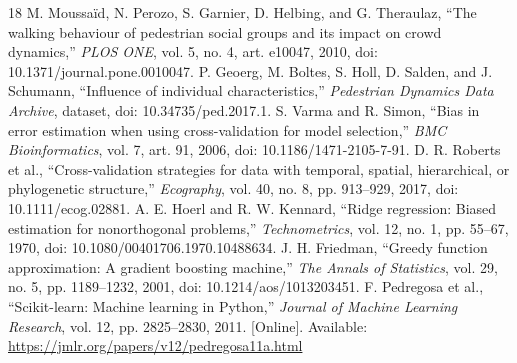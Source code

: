 \documentclass[conference]{IEEEtran}
\begin{document}
\begin{thebibliography}{18}
 M. Moussa\"id, N. Perozo, S. Garnier, D. Helbing, and G. Theraulaz, ``The walking behaviour of pedestrian social groups and its impact on crowd dynamics,'' \textit{PLOS ONE}, vol. 5, no. 4, art. e10047, 2010, doi: 10.1371/journal.pone.0010047.
 P. Geoerg, M. Boltes, S. Holl, D. Salden, and J. Schumann, ``Influence of individual characteristics,'' \textit{Pedestrian Dynamics Data Archive}, dataset, doi: 10.34735/ped.2017.1.
 S. Varma and R. Simon, ``Bias in error estimation when using cross-validation for model selection,'' \textit{BMC Bioinformatics}, vol. 7, art. 91, 2006, doi: 10.1186/1471-2105-7-91.
 D. R. Roberts et al., ``Cross-validation strategies for data with temporal, spatial, hierarchical, or phylogenetic structure,'' \textit{Ecography}, vol. 40, no. 8, pp. 913--929, 2017, doi: 10.1111/ecog.02881.
 A. E. Hoerl and R. W. Kennard, ``Ridge regression: Biased estimation for nonorthogonal problems,'' \textit{Technometrics}, vol. 12, no. 1, pp. 55--67, 1970, doi: 10.1080/00401706.1970.10488634.
 J. H. Friedman, ``Greedy function approximation: A gradient boosting machine,'' \textit{The Annals of Statistics}, vol. 29, no. 5, pp. 1189--1232, 2001, doi: 10.1214/aos/1013203451.
 F. Pedregosa et al., ``Scikit-learn: Machine learning in Python,'' \textit{Journal of Machine Learning Research}, vol. 12, pp. 2825--2830, 2011. [Online]. Available: \url{https://jmlr.org/papers/v12/pedregosa11a.html}
\end{thebibliography}
\end{document}
